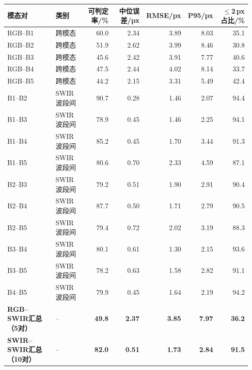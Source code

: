 \begin{tabular}{@{}llrrrrr@{}}
\toprule
模态对 & 类别 & 可判定率/\% & 中位误差/px & RMSE/px & P95/px & $\le$2\,px占比/\%\\
\midrule
RGB--B1 & 跨模态 & 60.0 & 2.34 & 3.89 & 8.03 & 35.1\\
RGB--B2 & 跨模态 & 51.9 & 2.62 & 3.99 & 8.46 & 30.8\\
RGB--B3 & 跨模态 & 45.6 & 2.42 & 3.91 & 7.77 & 40.6\\
RGB--B4 & 跨模态 & 47.5 & 2.44 & 4.02 & 8.14 & 33.7\\
RGB--B5 & 跨模态 & 44.2 & 2.15 & 3.31 & 5.49 & 42.4\\
B1--B2 & SWIR波段间 & 90.7 & 0.28 & 1.46 & 2.07 & 94.4\\
B1--B3 & SWIR波段间 & 78.9 & 0.45 & 1.46 & 2.25 & 94.1\\
B1--B4 & SWIR波段间 & 85.2 & 0.45 & 1.70 & 3.44 & 91.3\\
B1--B5 & SWIR波段间 & 80.6 & 0.70 & 2.33 & 4.59 & 87.1\\
B2--B3 & SWIR波段间 & 79.2 & 0.51 & 1.90 & 2.91 & 90.4\\
B2--B4 & SWIR波段间 & 87.7 & 0.50 & 1.71 & 2.79 & 90.5\\
B2--B5 & SWIR波段间 & 79.4 & 0.72 & 2.02 & 3.19 & 88.3\\
B3--B4 & SWIR波段间 & 80.1 & 0.61 & 1.30 & 2.15 & 93.6\\
B3--B5 & SWIR波段间 & 78.2 & 0.63 & 1.58 & 2.82 & 91.1\\
B4--B5 & SWIR波段间 & 79.9 & 0.45 & 1.64 & 2.19 & 94.2\\
\midrule
\textbf{RGB--SWIR汇总（5对）} & -- & \textbf{49.8} & \textbf{2.37} & \textbf{3.85} & \textbf{7.97} & \textbf{36.2}\\
\textbf{SWIR--SWIR汇总（10对）} & -- & \textbf{82.0} & \textbf{0.51} & \textbf{1.73} & \textbf{2.84} & \textbf{91.5}\\
\bottomrule
\end{tabular}
